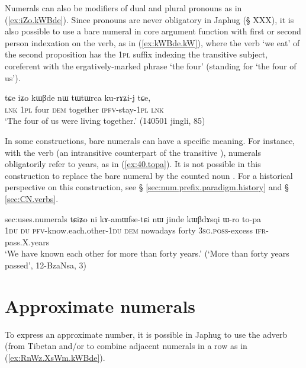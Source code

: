 Numerals can also be modifiers of dual and plural pronouns as in (\ref{ex:iZo.kWBde}). Since pronouns are never obligatory in Japhug (§ XXX), it is also possible to use a bare numeral in core argument function with first or second person indexation on the verb, as in (\ref{ex:kWBde.kW}), where the verb  `we eat' of the second proposition has the \textsc{1pl}  suffix indexing the transitive subject, coreferent with the ergatively-marked phrase  `the four' (standing for  `the four of us').

\begin{exe}
\ex \label{ex:iZo.kWBde} 
\gll tɕe iʑo kɯβde nɯ tɯtɯrca ku-rɤʑi-j tɕe, \\
\textsc{lnk} \textsc{1pl} four \textsc{dem}  together \textsc{ipfv}-stay-\textsc{1pl} \textsc{lnk} \\
\glt `The four of us were living together.' (140501 jingli, 85)
\end{exe}		

In some constructions, bare numerals can have a specific meaning. For instance, with the verb  (an intransitive counterpart of the transitive ), numerals obligatorily refer to years, as in (\ref{ex:40.topa}). It is not possible in this construction to replace the bare numeral by the counted noun  . For a historical perspective on this construction, see § \ref{sec:num.prefix.paradigm.history} and § \ref{sec:CN.verbs}.

\begin{exe}
\ex \label{ex:40.topa}  {sec:uses.numerals}
\gll tɕiʑo ni kɤ-amɯfse-tɕi nɯ jinde kɯβdɤsqi ɯ-ro to-pa \\
\textsc{1du} \textsc{du} \textsc{pfv}-know.each.other-\textsc{1du} \textsc{dem} nowadays forty \textsc{3sg.poss}-excess \textsc{ifr}-pass.X.years \\
\glt  `We have known each other for more than forty years.' (`More than forty years passed', 12-BzaNsa, 3)
 \end{exe}		
  
\section{Approximate numerals} \label{sec:approx.numerals}
To express an approximate number, it is possible in Japhug to use the adverb  (from Tibetan  and/or to combine adjacent numerals in a row as in (\ref{ex:RnWz.XsWm.kWBde}).

